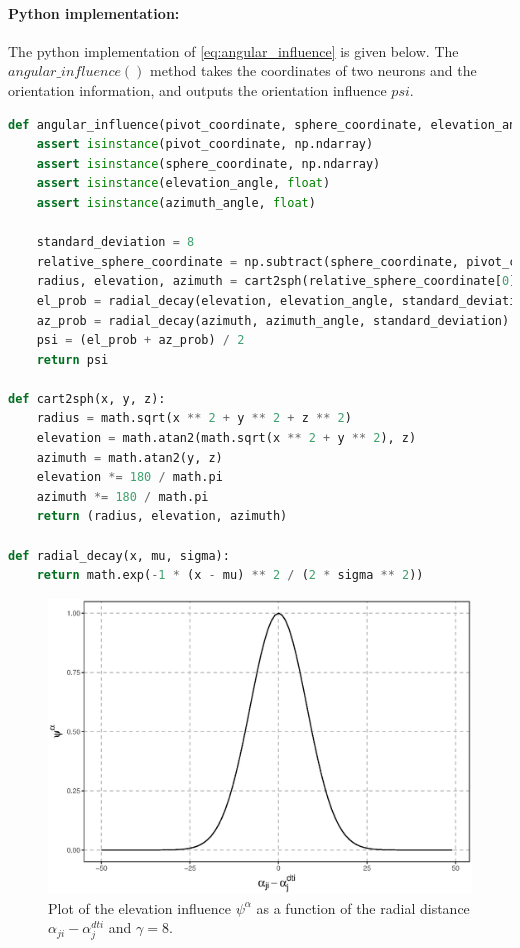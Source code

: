 \paragraph{Python implementation:} The python implementation of \equationname \ref{eq:angular_influence} is given below. The $angular\_influence()$ method takes the coordinates of two neurons and the orientation information, and outputs the orientation influence $psi$. 

\begin{lstlisting}[language=Python, caption={Python code for calculating static orientation influence}]
def angular_influence(pivot_coordinate, sphere_coordinate, elevation_angle, azimuth_angle):
	assert isinstance(pivot_coordinate, np.ndarray)
	assert isinstance(sphere_coordinate, np.ndarray)
	assert isinstance(elevation_angle, float)
	assert isinstance(azimuth_angle, float)
	
	standard_deviation = 8	
	relative_sphere_coordinate = np.subtract(sphere_coordinate, pivot_coordinate)
	radius, elevation, azimuth = cart2sph(relative_sphere_coordinate[0], relative_sphere_coordinate[1], relative_sphere_coordinate[2])	
	el_prob = radial_decay(elevation, elevation_angle, standard_deviation)
	az_prob = radial_decay(azimuth, azimuth_angle, standard_deviation)
	psi = (el_prob + az_prob) / 2
	return psi
	
def cart2sph(x, y, z):
	radius = math.sqrt(x ** 2 + y ** 2 + z ** 2)
	elevation = math.atan2(math.sqrt(x ** 2 + y ** 2), z)
	azimuth = math.atan2(y, z)	
	elevation *= 180 / math.pi
	azimuth *= 180 / math.pi
	return (radius, elevation, azimuth)

def radial_decay(x, mu, sigma):
	return math.exp(-1 * (x - mu) ** 2 / (2 * sigma ** 2))
\end{lstlisting}

\begin{figure}
	\centering
	\includegraphics[width=\linewidth]{fig/fmridti/angular_influence_rbf.eps}
	\caption{Plot of the elevation influence $\psi^\alpha$ as a function of the radial distance $\alpha_{ji}-\alpha_j^{dti}$ and $\gamma=8$.}
	\label{fig:angular_influence_rbf}
\end{figure}

